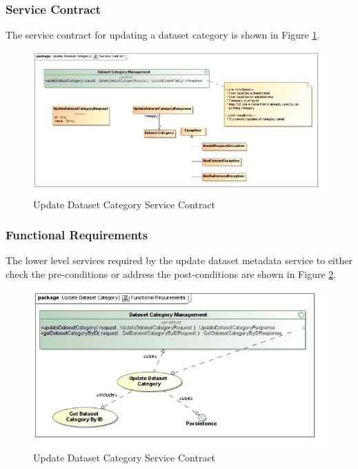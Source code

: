 \subsubsection{Service Contract}
The service contract for updating a dataset category is shown in 
Figure \ref{fig:uupdateDatasetCategoryServiceContract}.
\begin{figure}[H]
  \begin{center}
  \includegraphics[scale=0.38]{../Diagrams and Charts/Repository Management/Update Dataset Category Service Contract.jpg}
  \caption{Update Dataset Category Service Contract}
  \label{fig:uupdateDatasetCategoryServiceContract}
  \end{center}
\end{figure}

\subsubsection{Functional Requirements}
The lower level services required by the update dataset metadata service to
either check the pre-conditions or address the post-conditions are shown in 
Figure \ref{fig:updateDatasetCategoryFunctionalRequirements}.
\begin{figure}[H]
  \begin{center}
  \includegraphics[scale=0.38]{../Diagrams and Charts/Repository Management/Update Dataset Category Functional Requirements.jpg}
  \caption{Update Dataset Category Service Contract}
  \label{fig:updateDatasetCategoryFunctionalRequirements}
  \end{center}
\end{figure}




